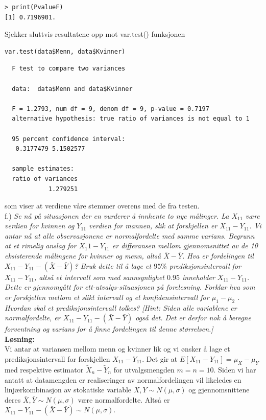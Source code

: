 \documentclass[12pt,
               a4paper,
               article,
               oneside,
               oldfontcommands,
               norsk]{memoir}
\begin{document}
\begin{verbatim} 
> print(PvalueF)
[1] 0.7196901.
\end{verbatim}
Sjekker sluttvis resultatene opp mot var.test() funksjonen
\begin{lstlisting}
var.test(data$Menn, data$Kvinner)
\end{lstlisting}
\begin{verbatim} 
  F test to compare two variances

  data:  data$Menn and data$Kvinner

  F = 1.2793, num df = 9, denom df = 9, p-value = 0.7197
  alternative hypothesis: true ratio of variances is not equal to 1
  
  95 percent confidence interval:
   0.3177479 5.1502577

  sample estimates:
  ratio of variances 
            1.279251 
\end{verbatim}
som viser at verdiene våre stemmer overens med de fra testen.\vspace{4mm}\\
f.) \emph{Se nå på situasjonen der en vurderer å innhente to nye målinger. La $X_{11}$ være verdien for kvinnen og $Y_{11}$ verdien for mannen, slik at forskjellen er $X_{11} − Y_{11}$. Vi antar nå at alle observasjonene er normalfordelte med samme varians. Begrunn at et rimelig anslag for $X_{1}1 − Y_{11}$ er differansen mellom gjennomsnittet av de 10 eksisterende målingene for kvinner og menn, altså $\bar{X}- \bar{Y}$. Hva er fordelingen til $X_{11} − Y_{11}-(\bar{X} - \bar{Y})$? Bruk dette til å lage et $95\%$ prediksjonsintervall for $X_{11} − Y_{11}$, altså et intervall som med sannsynlighet $0.95$ inneholder $X_{11} − Y_{11}$. Dette er gjennomgått for ett-utvalgs-situasjonen på forelesning. Forklar hva som er forskjellen mellom et slikt intervall og et konfidensintervall for $\mu_{1} − \mu_{2}$ . Hvordan skal et prediksjonsintervall tolkes? [Hint: Siden alle variablene er normalfordelte, er $X_{11} − Y_{11}-(\bar{X} - \bar{Y})$ også det. Det er derfor nok å beregne forventning og varians for å finne fordelingen til denne størrelsen.]}\vspace{4mm}\\ 
\textbf{Løsning:}\vspace{4mm}\\ 
Vi antar at variansen mellom menn og kvinner lik og vi ønsker å lage et prediksjonsintervall for forskjellen $X_{11} - Y_{11}$. Det gir at $E[X_{11} - Y_{11}] = \mu_{X} - \mu_{Y}$ med respektive estimator $\tilde{X}_n - \tilde{Y}_n$ for utvalgsmengden $m = n = 10$. Siden vi har antatt at datamengden er realiseringer av normalfordelingen vil likeledes en linjærkombinasjon av stokatiske variable $X, Y \sim N(\mu, \sigma)$ og gjennomsnittene deres $\bar{X}, \bar{Y} \sim N(\mu, \sigma)$ være normalfordelte. 
Altså er $X_{11} − Y_{11}-(\bar{X} - \bar{Y}) \sim N(\mu, \sigma)$.
\end{document}
